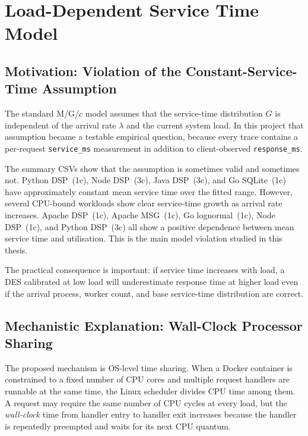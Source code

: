 ﻿\chapter{Load-Dependent Service Time Model}
\label{ch:loaddep}

\section{Motivation: Violation of the Constant-Service-Time Assumption}
\label{sec:loaddep-motivation}

The standard M/G/$c$ model assumes that the service-time distribution $G$ is independent of the arrival rate $\lambda$ and the current system load. In this project that assumption became a testable empirical question, because every trace contains a per-request \texttt{service\_ms} measurement in addition to client-observed \texttt{response\_ms}.

The summary CSVs show that the assumption is sometimes valid and sometimes not. Python DSP~(1c), Node DSP~(3c), Java DSP~(3c), and Go SQLite~(1c) have approximately constant mean service time over the fitted range. However, several CPU-bound workloads show clear service-time growth as arrival rate increases. Apache DSP~(1c), Apache MSG~(1c), Go lognormal~(1c), Node DSP~(1c), and Python DSP~(3c) all show a positive dependence between mean service time and utilisation. This is the main model violation studied in this thesis.

The practical consequence is important: if service time increases with load, a DES calibrated at low load will underestimate response time at higher load even if the arrival process, worker count, and base service-time distribution are correct.

\section{Mechanistic Explanation: Wall-Clock Processor Sharing}
\label{sec:ps-mechanism}

The proposed mechanism is OS-level time sharing. When a Docker container is constrained to a fixed number of CPU cores and multiple request handlers are runnable at the same time, the Linux scheduler divides CPU time among them. A request may require the same number of CPU cycles at every load, but the \emph{wall-clock} time from handler entry to handler exit increases because the handler is repeatedly preempted and waits for its next CPU quantum.

